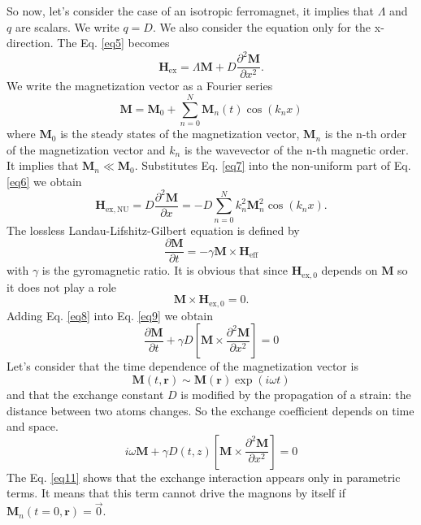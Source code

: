 \documentclass[aps,prl,amsmath,amssymb,preprint,superscriptaddress]{revtex4-1}
\begin{document}
So now, let's consider the case of an isotropic ferromagnet, it implies that $\Lambda$ and $q$ are scalars.
We write $q = D$.
We also consider the equation only for the x-direction.
The Eq. \eqref{eq5} becomes
\begin{equation}
    \mathbf{H}_{\mathrm{ex}} = \Lambda \mathbf{M} + D \frac{\partial^2 \mathbf{M}}{\partial x^2}.
    \label{eq6}
\end{equation}
We write the magnetization vector as a Fourier series
\begin{equation}
    \mathbf{M} = \mathbf{M}_0 + \sum_{n=0}^N \mathbf{M}_n \left( t \right) \cos \left( k_n x\right)
    \label{eq7}
\end{equation}
where $\mathbf{M}_0$ is the steady states of the magnetization vector, $\mathbf{M}_n$ is the n-th order of the magnetization vector and $k_n$ is the wavevector of the n-th magnetic order.
It implies that $\mathbf{M}_n \ll \mathbf{M}_0$.
Substitutes Eq. \eqref{eq7} into the non-uniform part of Eq. \eqref{eq6} we obtain 
\begin{equation}
    \mathbf{H}_{\mathrm{ex,NU}} =  D \frac{\partial^2 \mathbf{M}}{\partial x} = - D \sum_{n=0}^N k^2_n \mathbf{M}_n^2 \cos \left( k_n x\right).
    \label{eq8}
\end{equation}
The lossless Landau-Lifshitz-Gilbert equation is defined by
\begin{equation}
    \frac{\partial \mathbf{M}}{\partial t} = - \gamma \mathbf{M} \times \mathbf{H}_{\mathrm{eff}}
    \label{eq9}
\end{equation}
with $\gamma$ is the gyromagnetic ratio.
It is obvious that since $\mathbf{H}_{\mathrm{ex,0}}$ depends on $\textbf{M}$ so it does not play a role $$\mathbf{M} \times \mathbf{H}_{\mathrm{ex,0}} =0.$$
Adding Eq. \eqref{eq8} into Eq. \ref{eq9} we obtain
\begin{equation}
    \frac{\partial \mathbf{M}}{\partial t} + \gamma D \left[ \mathbf{M} \times \frac{\partial^2 \mathbf{M}}{\partial x^2} \right] = 0
    \label{eq10}
\end{equation}
Let's consider that the time dependence of the magnetization vector is $$\mathbf{M} \left(t, \mathbf{r} \right) \sim \mathbf{M} \left( \mathbf{r} \right) \exp \left( i \omega t \right)$$ and that the exchange constant $D$ is modified by the propagation of a strain: the distance between two atoms changes.
So the exchange coefficient depends on time and space.
\begin{equation}
    i \omega \mathbf{M} + \gamma D \left( t, z \right) \left[ \mathbf{M} \times \frac{\partial^2 \mathbf{M}}{\partial x^2} \right] = 0
    \label{eq11}
\end{equation}
The Eq. \eqref{eq11} shows that the exchange interaction appears only in parametric terms.
It means that this term cannot drive the magnons by itself if $\mathbf{M}_n \left( t = 0, \mathbf{r} \right) = \overrightarrow{0}$.
\end{document}
